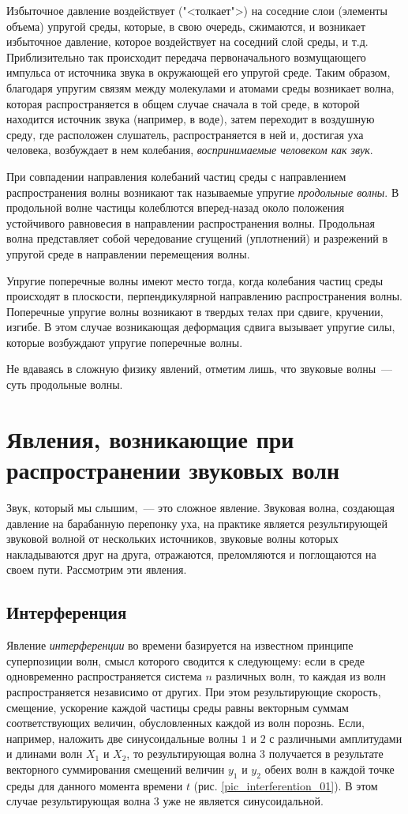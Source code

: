 \documentclass[oneside, final, 14pt]{extreport}
\begin{document}
Избыточное давление воздействует ("<толкает">) на соседние слои (элементы объема) упругой среды, которые, в свою очередь, сжимаются, и возникает избыточное давление, которое воздействует на соседний слой среды, и т.д. Приблизительно так происходит передача первоначального возмущающего импульса от источника звука в окружающей его упругой среде. Таким образом, благодаря упругим связям между молекулами и атомами среды возникает волна, которая распространяется в общем случае сначала в той среде, в которой находится источник звука (например, в воде), затем переходит в воздушную среду, где расположен слушатель, распространяется в ней и, достигая уха человека, возбуждает в нем колебания, {\itshape воспринимаемые человеком как звук}.

При совпадении направления колебаний частиц среды с направлением распространения волны возникают так называемые упругие {\itshape продольные волны}. В продольной волне частицы колеблются вперед-назад около положения устойчивого равновесия в направлении распространения волны. Продольная волна представляет собой чередование сгущений (уплотнений) и разрежений в упругой среде в направлении перемещения волны.

Упругие поперечные волны имеют место тогда, когда колебания частиц среды происходят в плоскости, перпендикулярной направлению распространения волны. Поперечные упругие волны возникают в твердых телах при сдвиге, кручении, изгибе. В этом случае возникающая деформация сдвига вызывает упругие силы, которые возбуждают упругие поперечные волны.

Не вдаваясь в сложную физику явлений, отметим лишь, что звуковые волны~--- суть продольные волны.
\section{Явления, возникающие при распространении звуковых волн}
Звук, который мы слышим,~--- это сложное явление. Звуковая волна, создающая давление на барабанную перепонку уха, на практике является результирующей звуковой волной от нескольких источников, звуковые волны которых накладываются друг на друга, отражаются, преломляются и поглощаются на своем пути. Рассмотрим эти явления.
\subsection{Интерференция}
Явление {\itshape интерференции} во времени базируется на известном принципе суперпозиции волн, смысл которого сводится к следующему: если в среде одновременно распространяется система \(n\) различных волн, то каждая из волн распространяется независимо от других. При этом результирующие скорость, смещение, ускорение каждой частицы среды равны векторным суммам соответствующих величин, обусловленных каждой из волн порознь. Если, например, наложить две синусоидальные волны \(1\) и \(2\) с различными амплитудами и длинами волн \(X_1\) и \(X_2\), то результирующая волна \(3\) получается в результате векторного суммирования смещений величин \(y_1\) и \(y_2\) обеих волн в каждой точке среды для данного момента времени \(t\) (рис. \ref{pic_interferention_01}). В этом случае результирующая волна \(3\) уже не является синусоидальной.
\end{document}
